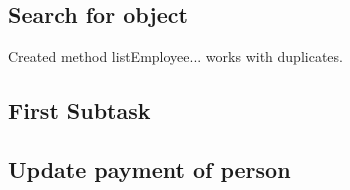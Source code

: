 \documentclass[a4paper]{article}
\begin{document}
\subsection{Search for object}
Created method listEmployee... works with duplicates.
\subsection{First Subtask}
\subsection{Update payment of person}


\bigskip

\end{document}
